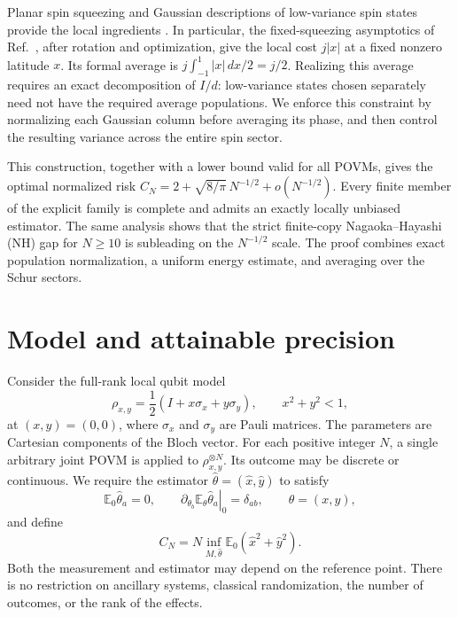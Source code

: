 \documentclass[aps,pra,reprint,superscriptaddress,longbibliography]{revtex4-2}
\theoremstyle{remark}
\newcommand{\E}{\mathbb E}
\begin{document}
Planar spin squeezing and Gaussian descriptions of low-variance spin
states provide the local ingredients \cite{He2011,Dammeier2015}.
In particular, the fixed-squeezing asymptotics of
Ref.~\cite[Theorem~4]{Dammeier2015}, after rotation and optimization, give
the local cost $j|x|$ at a fixed nonzero latitude $x$.
Its formal average is $j\int_{-1}^1|x|\,dx/2=j/2$.
Realizing this average requires an exact decomposition of $I/d$:
low-variance states chosen separately need not have the required average
populations. We enforce this constraint by normalizing each Gaussian
column before averaging its phase, and then control the resulting
variance across the entire spin sector.

This construction, together with a lower bound valid for all POVMs,
gives the optimal normalized risk
$C_N=2+\sqrt{8/\pi}\,N^{-1/2}+o(N^{-1/2})$.
Every finite member of the explicit family is complete and admits an
exactly locally unbiased estimator. The same analysis shows that the
strict finite-copy Nagaoka--Hayashi (NH) gap for $N\geq10$ is subleading
on the $N^{-1/2}$ scale. The proof combines exact population normalization,
a uniform energy estimate, and averaging over the Schur sectors.

\section{Model and attainable precision}\label{sec:model}\label{sec:reduction}
Consider the full-rank local qubit model
\begin{equation}
 \rho_{x,y}=\frac12(I+x\sigma_x+y\sigma_y),\qquad x^2+y^2<1,
 \label{eq:model}
\end{equation}
at $(x,y)=(0,0)$, where $\sigma_x$ and $\sigma_y$ are Pauli matrices.
The parameters are Cartesian components of the Bloch vector.
For each positive integer $N$, a single arbitrary joint
POVM is applied to $\rho_{x,y}^{\otimes N}$. Its outcome may be discrete
or continuous. We require the estimator $\widehat\theta=(\widehat x,
\widehat y)$ to satisfy
\begin{equation}
 \E_0\widehat\theta_a=0,\qquad
 \left.\partial_{\theta_b}\E_\theta\widehat\theta_a\right|_0
 =\delta_{ab},\qquad \theta=(x,y),
 \label{eq:unbiased}
\end{equation}
and define
\begin{equation}
 C_N=N\inf_{M,\widehat\theta}
 \E_0(\widehat x^2+\widehat y^2).
 \label{eq:risk}
\end{equation}
Both the measurement and estimator may depend on the reference point.
There is no restriction on ancillary systems, classical randomization,
the number of outcomes, or the rank of the effects.
\end{document}
